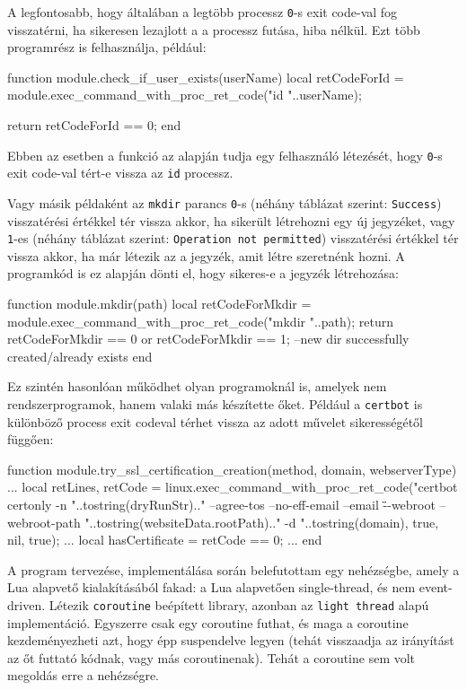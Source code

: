 A legfontosabb, hogy általában a legtöbb processz \texttt{0}-s exit code-val fog visszatérni, ha sikeresen lezajlott a a processz futása, hiba nélkül. Ezt több programrész is felhasználja, például:

\begin{lua}
function module.check_if_user_exists(userName)
    local retCodeForId = module.exec_command_with_proc_ret_code("id "..userName);

    return retCodeForId == 0;
end
\end{lua}

Ebben az esetben a \texttt{} funkció az alapján tudja egy felhasználó létezését, hogy \texttt{0}-s exit code-val tért-e vissza az \texttt{id} processz.

Vagy másik példaként az \texttt{mkdir} parancs \texttt{0}-s (néhány táblázat szerint: \texttt{Success}) visszatérési értékkel tér vissza akkor, ha sikerült létrehozni egy új jegyzéket, vagy \texttt{1}-es (néhány táblázat szerint: \texttt{Operation not permitted}) visszatérési értékkel tér vissza akkor, ha már létezik az a jegyzék, amit létre szeretnénk hozni. A programkód is ez alapján dönti el, hogy sikeres-e a jegyzék létrehozása:
\begin{lua}
function module.mkdir(path)
    local retCodeForMkdir = module.exec_command_with_proc_ret_code("mkdir "..path);
    return retCodeForMkdir == 0 or retCodeForMkdir == 1; --new dir successfully created/already exists
end
\end{lua}

Ez szintén hasonlóan működhet olyan programoknál is, amelyek nem rendszerprogramok, hanem valaki más készítette őket. Például a \texttt{certbot} is különböző process exit codeval térhet vissza az adott művelet sikerességétől függően:
\begin{lua}
function module.try_ssl_certification_creation(method, domain, webserverType)
	...
	local retLines, retCode = linux.exec_command_with_proc_ret_code("certbot certonly -n "..tostring(dryRunStr).." --agree-tos --no-eff-email --email \"\" --webroot --webroot-path "..tostring(websiteData.rootPath).." -d "..tostring(domain), true, nil, true);
	...
	local hasCertificate = retCode == 0;
	...
end
\end{lua}

\pagebreak
{}

A program tervezése, implementálása során belefutottam egy nehézségbe, amely a Lua alapvető kialakításából fakad: a Lua alapvetően single-thread, és nem event-driven. Létezik \texttt{coroutine} beépített library, azonban az \texttt{light thread} alapú implementáció. Egyszerre csak egy coroutine futhat, és maga a coroutine kezdeményezheti azt, hogy épp suspendelve legyen (tehát visszaadja az irányítást az őt futtató kódnak, vagy más coroutinenak). Tehát a coroutine sem volt megoldás erre a nehézségre.

